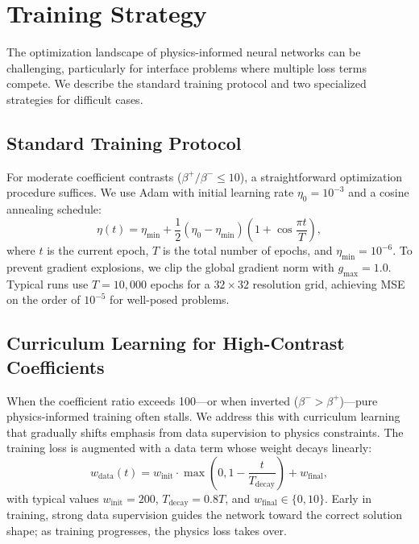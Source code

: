 \documentclass[11pt]{article}
\theoremstyle{definition}
\theoremstyle{remark}
\theoremstyle{plain}
\begin{document}
\section{Training Strategy}
\label{sec:training}

The optimization landscape of physics-informed neural networks can be challenging, particularly for interface problems where multiple loss terms compete. We describe the standard training protocol and two specialized strategies for difficult cases.

\subsection{Standard Training Protocol}

For moderate coefficient contrasts ($\beta^+ / \beta^- \leq 10$), a straightforward optimization procedure suffices. We use Adam with initial learning rate $\eta_0 = 10^{-3}$ and a cosine annealing schedule:
\begin{equation}
    \eta(t) = \eta_{\min} + \frac{1}{2}(\eta_0 - \eta_{\min}) \left( 1 + \cos\frac{\pi t}{T} \right),
\end{equation}
where $t$ is the current epoch, $T$ is the total number of epochs, and $\eta_{\min} = 10^{-6}$. To prevent gradient explosions, we clip the global gradient norm with $g_{\max} = 1.0$. Typical runs use $T = 10{,}000$ epochs for a $32 \times 32$ resolution grid, achieving MSE on the order of $10^{-5}$ for well-posed problems.

\subsection{Curriculum Learning for High-Contrast Coefficients}

When the coefficient ratio exceeds 100---or when inverted ($\beta^- > \beta^+$)---pure physics-informed training often stalls. We address this with curriculum learning that gradually shifts emphasis from data supervision to physics constraints. The training loss is augmented with a data term whose weight decays linearly:
\begin{equation}
    w_{\text{data}}(t) = w_{\text{init}} \cdot \max\left(0, 1 - \frac{t}{T_{\text{decay}}}\right) + w_{\text{final}},
\end{equation}
with typical values $w_{\text{init}} = 200$, $T_{\text{decay}} = 0.8T$, and $w_{\text{final}} \in \{0, 10\}$. Early in training, strong data supervision guides the network toward the correct solution shape; as training progresses, the physics loss takes over.
\end{document}
